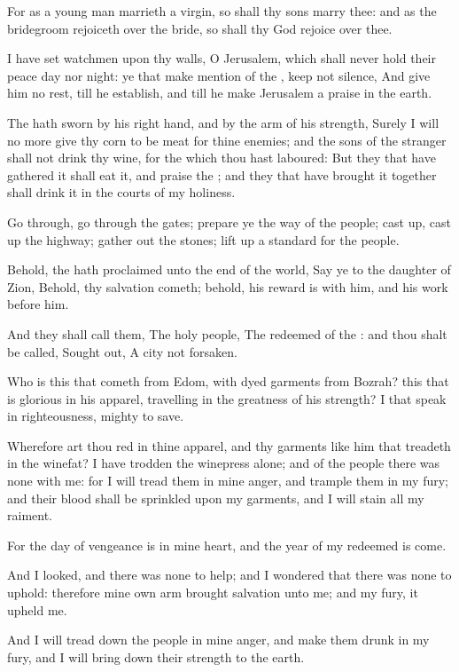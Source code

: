 \Verse For as a young man marrieth a virgin, so shall thy sons marry thee: and as the bridegroom rejoiceth over the bride, so shall thy God rejoice over thee.

\Verse I have set watchmen upon thy walls, O Jerusalem, which shall never hold their peace day nor night: ye that make mention of the \LORD, keep not silence, \Verse And give him no rest, till he establish, and till he make Jerusalem a praise in the earth.

\Verse The \LORD hath sworn by his right hand, and by the arm of his strength, Surely I will no more give thy corn to be meat for thine enemies; and the sons of the stranger shall not drink thy wine, for the which thou hast laboured: \Verse But they that have gathered it shall eat it, and praise the \LORD; and they that have brought it together shall drink it in the courts of my holiness.

\Verse Go through, go through the gates; prepare ye the way of the people; cast up, cast up the highway; gather out the stones; lift up a standard for the people.

\Verse Behold, the \LORD hath proclaimed unto the end of the world, Say ye to the daughter of Zion, Behold, thy salvation cometh; behold, his reward is with him, and his work before him.

\Verse And they shall call them, The holy people, The redeemed of the \LORD: and thou shalt be called, Sought out, A city not forsaken.


\Chapter
\Verse Who is this that cometh from Edom, with dyed garments from Bozrah?  this that is glorious in his apparel, travelling in the greatness of his strength? I that speak in righteousness, mighty to save.

\Verse Wherefore art thou red in thine apparel, and thy garments like him that treadeth in the winefat?  \Verse I have trodden the winepress alone; and of the people there was none with me: for I will tread them in mine anger, and trample them in my fury; and their blood shall be sprinkled upon my garments, and I will stain all my raiment.

\Verse For the day of vengeance is in mine heart, and the year of my redeemed is come.

\Verse And I looked, and there was none to help; and I wondered that there was none to uphold: therefore mine own arm brought salvation unto me; and my fury, it upheld me.

\Verse And I will tread down the people in mine anger, and make them drunk in my fury, and I will bring down their strength to the earth.

